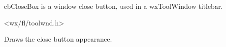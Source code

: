 %
%


\section{}\label{cbclosebox}


cbCloseBox is a window close button, used in a wxToolWindow titlebar.




<wx/fl/toolwnd.h>




\label{cbcloseboxdraw}


Draws the close button appearance.

